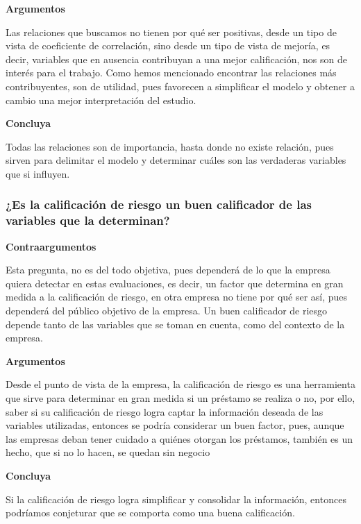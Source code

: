 \documentclass[
  letterpaper,
  DIV=11,
  numbers=noendperiod]{scrreprt}
\begin{document}
\textbf{Argumentos}

Las relaciones que buscamos no tienen por qué ser positivas, desde un
tipo de vista de coeficiente de correlación, sino desde un tipo de vista
de mejoría, es decir, variables que en ausencia contribuyan a una mejor
calificación, nos son de interés para el trabajo. Como hemos mencionado
encontrar las relaciones más contribuyentes, son de utilidad, pues
favorecen a simplificar el modelo y obtener a cambio una mejor
interpretación del estudio.

\textbf{Concluya}

Todas las relaciones son de importancia, hasta donde no existe relación,
pues sirven para delimitar el modelo y determinar cuáles son las
verdaderas variables que si influyen.

\subsubsection{\texorpdfstring{\textbf{¿Es la calificación de riesgo un
buen calificador de las variables que la
determinan?}}{¿Es la calificación de riesgo un buen calificador de las variables que la determinan?}}\label{es-la-calificaciuxf3n-de-riesgo-un-buen-calificador-de-las-variables-que-la-determinan}

\textbf{Contraargumentos}

Esta pregunta, no es del todo objetiva, pues dependerá de lo que la
empresa quiera detectar en estas evaluaciones, es decir, un factor que
determina en gran medida a la calificación de riesgo, en otra empresa no
tiene por qué ser así, pues dependerá del público objetivo de la
empresa. Un buen calificador de riesgo depende tanto de las variables
que se toman en cuenta, como del contexto de la empresa.

\textbf{Argumentos}

Desde el punto de vista de la empresa, la calificación de riesgo es una
herramienta que sirve para determinar en gran medida si un préstamo se
realiza o no, por ello, saber si su calificación de riesgo logra captar
la información deseada de las variables utilizadas, entonces se podría
considerar un buen factor, pues, aunque las empresas deban tener cuidado
a quiénes otorgan los préstamos, también es un hecho, que si no lo
hacen, se quedan sin negocio

\textbf{Concluya}

Si la calificación de riesgo logra simplificar y consolidar la
información, entonces podríamos conjeturar que se comporta como una
buena calificación.
\end{document}
